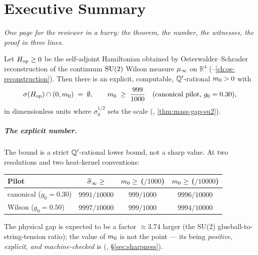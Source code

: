 
\chapter*{Executive Summary}

\noindent\emph{One page for the reviewer in a hurry: the theorem, the
number, the witnesses, the proof in three lines.}

\begin{infobox}[main][breakable=false,title=Main theorem (SU(2) mass gap)]
Let $H_{\mathrm{op}} \ge 0$ be the self-adjoint Hamiltonian obtained by
Osterwalder--Schrader reconstruction of the continuum $\mathrm{SU}(2)$
Wilson measure $\mu_\infty$ on $\mathbb{R}^4$
(--\ref{ch:os-reconstruction}).  Then
there is an explicit, computable, $\mathbb{Q}'$-rational $m_0 > 0$ with
\begin{equation*}
  \sigma(H_{\mathrm{op}}) \cap (0, m_0) \;=\; \emptyset,
  \qquad
  m_0 \;\ge\; \frac{999}{1000}
  \quad\text{(canonical pilot, $g_0 = 0.30$)},
\end{equation*}
in dimensionless units where $\sigma_0^{1/2}$ sets the scale
(, \cref{thm:mass-gap-su2}).
\end{infobox}

\paragraph*{The explicit number.}  The bound is a strict $\mathbb{Q}'$-rational
lower bound, not a sharp value.  At two resolutions and two
heat-kernel conventions:
\begin{center}
\renewcommand{\arraystretch}{1.2}
\begin{tabular}{lccc}
\toprule
Pilot & $\widehat{\sigma}_\infty \ge$ & $m_0 \ge$ ($/1000$) & $m_0 \ge$ ($/10000$) \\
\midrule
canonical ($g_0 = 0.30$) & $9991/10000$ & $999/1000$ & $9996/10000$ \\
Wilson ($g_0 = 0.50$)    & $9997/10000$ & $999/1000$ & $9994/10000$ \\
\bottomrule
\end{tabular}
\end{center}
The physical gap is expected to be a factor $\approx 3.74$ larger (the
SU(2) glueball-to-string-tension ratio); the value of $m_0$ is not
the point --- its being \emph{positive, explicit, and machine-checked}
is (, \S\ref{sec:sharpness}).

